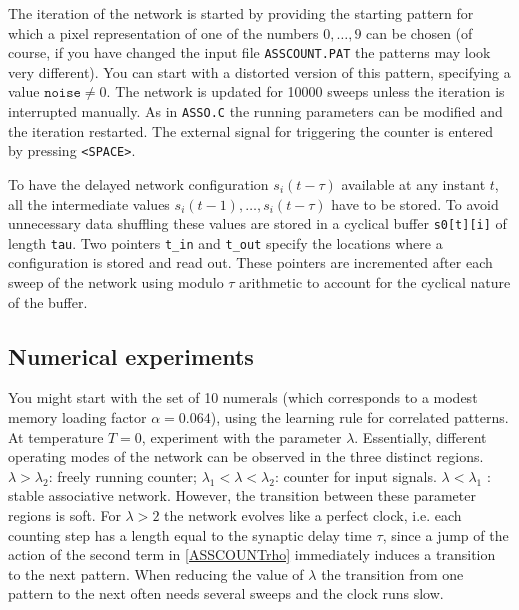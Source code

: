 The iteration of the network is started by providing the starting pattern for which a pixel representation of one of the numbers $0,\ldots,9$ can be chosen (of course, if you have changed the input file \texttt{ASSCOUNT.PAT} the patterns may look very different). You can start with a distorted version of this pattern, specifying a value $\texttt{noise}\neq0$. The network is updated for \num{10000} sweeps unless the iteration is interrupted manually. As in \texttt{ASSO.C} the running parameters can be modified and the iteration restarted. The external signal for triggering the counter is entered by pressing \texttt{<SPACE>}.

To have the delayed network configuration $s_i(t-\tau)$ available at any instant $t$, all the intermediate values $s_i(t-1),\ldots,s_i(t-\tau)$ have to be stored. To avoid unnecessary data shuffling these values are stored in a cyclical buffer \texttt{s0[t][i]} of length \texttt{tau}. Two pointers \texttt{t\_in} and \texttt{t\_out} specify the locations where a configuration is stored and read out. These pointers are incremented after each sweep of the network using modulo $\tau$ arithmetic to account for the cyclical nature of the buffer.
\subsection{Numerical experiments}
You might start with the set of 10 numerals (which corresponds to a modest memory loading factor $\alpha=0.064$), using the learning rule for correlated patterns. At temperature $T=0$, experiment with the parameter $\lambda$. Essentially, different operating modes of the network can be observed in the three distinct regions. $\lambda>\lambda_2$: freely running counter; $\lambda_1<\lambda<\lambda_2$: counter for input signals. $\lambda<\lambda_1$ : stable associative network. However, the transition between these parameter regions is soft. For $\lambda>2$ the network evolves like a perfect clock, i.e. each counting step has a length equal to the synaptic delay time $\tau$, since a jump of the action of the second term in \eqref{ASSCOUNTrho} immediately induces a transition to the next pattern. When reducing the value of $\lambda$ the transition from one pattern to the next often needs several sweeps and the clock runs slow.

